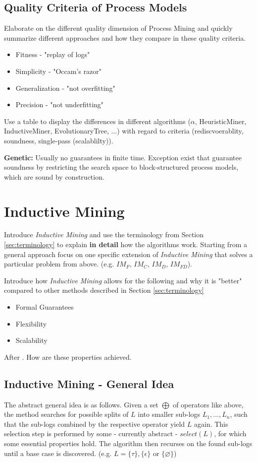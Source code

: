 \documentclass[a4paper]{IEEEtran}
\begin{document}
\subsection{Quality Criteria of Process Models}

Elaborate on the different quality dimension of Process Mining and quickly summarize different approaches and how they compare in these quality criteria.
\begin{itemize}
    \item Fitness - "replay of logs"
    \item Simplicity - "Occam's razor" 
    \item Generalization - "not overfitting" 
    \item Precision - "not underfitting" 
\end{itemize}
Use a table to display the differences in different algorithms ($\alpha$, HeuristicMiner, InductiveMiner, EvolutionaryTree, ...) with regard to criteria (rediscvoerablity, soundness, single-pass (scalablilty)).


\textbf{Genetic:} Usually no guarantees in finite time. Exception exist that guarantee soundness by restricting the search space to block-structured process models, which are sound by construction. \cite{van2011geneticsoundness}
\section{Inductive Mining}
\label{sec:inductivemining}
Introduce \textit{Inductive Mining} and use the terminology from Section \ref{sec:terminology} to explain \textbf{in detail} how the algorithms work. Starting from a general approach focus on one specific extension of \textit{Inductive Mining} that solves a particular problem from above. (e.g. $IM_F$, $IM_C$, $IM_D$, $IM_{FD}$).

Introduce how \textit{Inductive Mining} allows for the following and why it is "better" compared to other methods described in Section \ref{sec:terminology}
\begin{itemize}
    \item Formal Guarantees
    \item Flexibility 
    \item Scalability
\end{itemize} 
After \cite{process_mining}. How are these properties achieved. 

\subsection{Inductive Mining - General Idea}
The abstract general idea is as follows. Given a set $\bigoplus$ of operators like above, the method searches for possible splits of $L$ into smaller sub-logs $L_1, \dots, L_n$, such that the sub-logs combined by the respective operator yield $L$ again. This selection step is performed by some - currently abstract - $select(L)$, for which some essential properties hold. The algorithm then recurses on the found sub-logs until a base case is discovered. (e.g. $L = \{ \tau \}, \{ \epsilon \}$ or $\{ \varnothing \}$)
\end{document}
